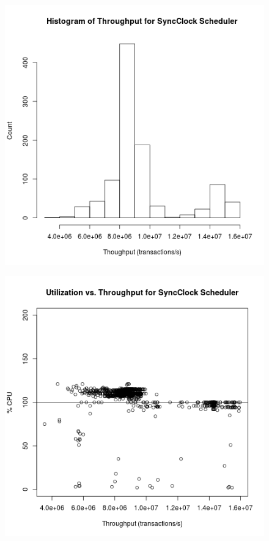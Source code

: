 \begin{figure}
\center
\includegraphics[width=\textwidth]{sync_clock_throughput_hist.png}
\caption{\label{sync_clock_throughput}}
\end{figure}

\begin{figure}
\center
\includegraphics[width=\textwidth]{sync_clock_throughput_utilization.png}
\caption{\label{sync_clock_throughput_utilization}}
\end{figure}

